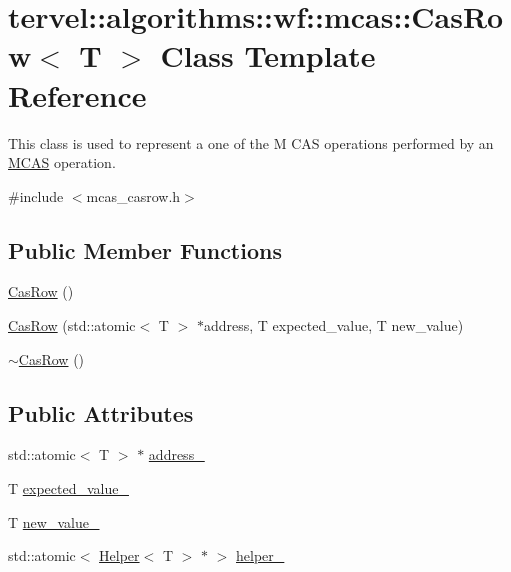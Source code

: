 \hypertarget{classtervel_1_1algorithms_1_1wf_1_1mcas_1_1_cas_row}{}\section{tervel\+:\+:algorithms\+:\+:wf\+:\+:mcas\+:\+:Cas\+Row$<$ T $>$ Class Template Reference}
\label{classtervel_1_1algorithms_1_1wf_1_1mcas_1_1_cas_row}


This class is used to represent a one of the M C\+A\+S operations performed by an \hyperlink{classtervel_1_1algorithms_1_1wf_1_1mcas_1_1_m_c_a_s}{M\+C\+A\+S} operation.  




{\ttfamily \#include $<$mcas\+\_\+casrow.\+h$>$}

\subsection*{Public Member Functions}
\begin{DoxyCompactItemize}
\item 
\hyperlink{classtervel_1_1algorithms_1_1wf_1_1mcas_1_1_cas_row_a5c9234abd6cf605b0de5b8d5589afcab}{Cas\+Row} ()
\item 
\hyperlink{classtervel_1_1algorithms_1_1wf_1_1mcas_1_1_cas_row_a817b55482cc93b3503c3d37d479943c8}{Cas\+Row} (std\+::atomic$<$ T $>$ $\ast$address, T expected\+\_\+value, T new\+\_\+value)
\item 
\hyperlink{classtervel_1_1algorithms_1_1wf_1_1mcas_1_1_cas_row_a6dd876b641f1e88f951d6a3cd72be34b}{$\sim$\+Cas\+Row} ()
\end{DoxyCompactItemize}
\subsection*{Public Attributes}
\begin{DoxyCompactItemize}
\item 
std\+::atomic$<$ T $>$ $\ast$ \hyperlink{classtervel_1_1algorithms_1_1wf_1_1mcas_1_1_cas_row_a8481dc81b0be30ba611a7f4478989710}{address\+\_\+}
\item 
T \hyperlink{classtervel_1_1algorithms_1_1wf_1_1mcas_1_1_cas_row_a66a7a49d2689691763631b635d0f80b6}{expected\+\_\+value\+\_\+}
\item 
T \hyperlink{classtervel_1_1algorithms_1_1wf_1_1mcas_1_1_cas_row_adcc297c44b5dafc6b08b9fcf3cdc277e}{new\+\_\+value\+\_\+}
\item 
std\+::atomic$<$ \hyperlink{classtervel_1_1algorithms_1_1wf_1_1mcas_1_1_helper}{Helper}$<$ T $>$ $\ast$ $>$ \hyperlink{classtervel_1_1algorithms_1_1wf_1_1mcas_1_1_cas_row_a762b03fb15cb83f591430c393bd3b444}{helper\+\_\+}
\end{DoxyCompactItemize}

